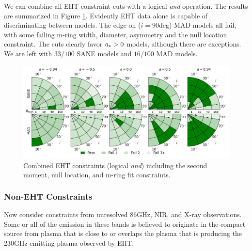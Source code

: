 
We can combine all EHT constraint cuts with a logical {\em and} operation.  The results are summarized in Figure  \ref{fig:all_EHT_constraints}.  Evidently EHT data alone is capable of discriminating between models.   The edge-on ($i = 90$deg) MAD models all fail, with some failing m-ring width, diameter, asymmetry and the null location constraint.  The cuts clearly favor $a_* > 0$ models, although there are exceptions.  We are left with $33/100$ SANE models and $16/100$ MAD models.

\begin{figure}
  \centering
    \includegraphics[width=\textwidth]{./figures/Interferometric_Constraints.png}
  \caption{Combined EHT constraints (logical {\em and}) including the second moment, null location, and m-ring fit constraints.}
  \label{fig:all_EHT_constraints}
\end{figure}

\subsubsection{Non-EHT Constraints}

Now consider constraints from unresolved 86GHz, NIR, and X-ray observations.  Some or all of the emission in these bands is believed to originate in the compact source from plasma that is close to or overlaps the plasma that is producing the 230GHz-emitting plasma observed by EHT.

\begin{figure}
  \caption{}
  \label{fig:passfail_noneht}
\end{figure}

